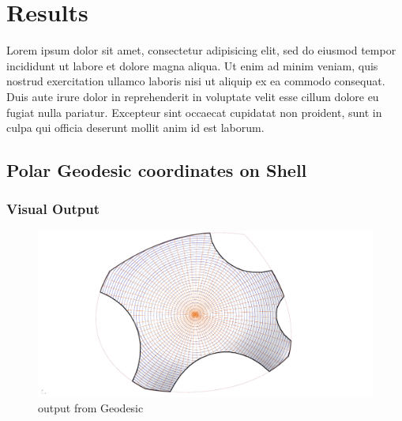 \chapter{Results}
Lorem ipsum dolor sit amet, consectetur adipisicing elit, sed do eiusmod tempor incididunt ut labore et dolore magna aliqua. Ut enim ad minim veniam, quis nostrud exercitation ullamco laboris nisi ut aliquip ex ea commodo consequat. Duis aute irure dolor in reprehenderit in voluptate velit esse cillum dolore eu fugiat nulla pariatur. Excepteur sint occaecat cupidatat non proident, sunt in culpa qui officia deserunt mollit anim id est laborum.




\section{Polar Geodesic coordinates on Shell}


\subsection{Visual Output}

\begin{figure}[H]
\centering
\includegraphics[width=1.0\linewidth ]{figure/Results/geotop2.jpg}
\caption{output from Geodesic}
\end{figure}

